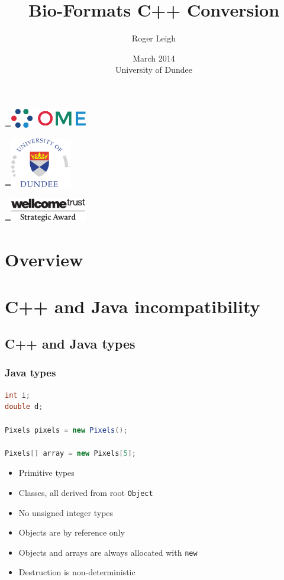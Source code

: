 \documentclass{beamer}
\title{Bio-Formats C++ Conversion}
\author{Roger Leigh}
\date{March 2014\\University of Dundee}
\newcommand*{\vcenteredhbox}[1]{\begingroup
\setbox0=\hbox{#1}\parbox{\wd0}{\box0}\endgroup}
\begin{document}
\begin{frame}[plain]
  \titlepage
  \begin{center}
    \vcenteredhbox{\includegraphics[width=0.25\textwidth]{ome}} \hfill
    \vcenteredhbox{\includegraphics[width=0.2\textwidth]{dundee}}\hfill
    \vcenteredhbox{\includegraphics[width=0.25\textwidth]{wellcome}}
  \end{center}
\end{frame}

\section*{Overview}

\section{C++ and Java incompatibility}
\subsection{C++ and Java types}

\begin{frame}[fragile]
  \frametitle{Java types}
  \begin{lstlisting}[language=Java]
int i;
double d;

Pixels pixels = new Pixels();

Pixels[] array = new Pixels[5];
\end{lstlisting}
  \begin{itemize}
  \item Primitive types
  \item Classes, all derived from root \texttt{Object}
  \item No unsigned integer types
  \item Objects are by reference only
  \item Objects and arrays are always allocated with \texttt{new}
  \item Destruction is non-deterministic
  \end{itemize}
\end{frame}
\end{document}
